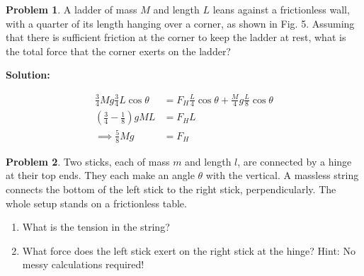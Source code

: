 \documentclass{article}
\theoremstyle{definition}
\newtheorem{problem}{Problem}
\newenvironment{solution}
  {\par\vspace{0.5em}\noindent\textbf{Solution:}\par\nopagebreak\vspace{0.3em}}
  {\par\vspace{1em}}
\begin{document}
\begin{problem}
    \begin{minipage}[c]{0.75\textwidth}
        A ladder of mass $M$ and length $L$ leans against a frictionless wall, with a quarter of its length hanging over a corner, as shown in Fig. 5. Assuming that there is sufficient friction at the corner to keep the ladder at rest, what is the total force that the corner exerts on the ladder?
    \end{minipage}
    \begin{minipage}[c]{0.22\textwidth}
        \centering
    \end{minipage}%
    \hfill
\end{problem}
\begin{solution}
        \begin{align*}
        \frac{3}{4} M g \frac{3}{4} L \cos\theta &= F_H \frac{L}{4} \cos\theta + \frac{M}{4} g \frac{L}{8} \cos\theta \\
        \left( \frac{3}{4} - \frac{1}{8} \right) g M L &= F_H L \\
        \implies \frac{5}{8} M g &= F_H
        \end{align*}
\end{solution}
\begin{problem}
    Two sticks, each of mass $m$ and length $l$, are connected by a hinge at their top ends. They each make an angle $\theta$ with the vertical. A massless string connects the bottom of the left stick to the right stick, perpendicularly. The whole setup stands on a frictionless table. 
    \begin{enumerate}[label=(\alph*)]
        \item What is the tension in the string?
        \item What force does the left stick exert on the right stick at the hinge? Hint: No messy calculations required!
    \end{enumerate}
\end{problem}
\end{document}
